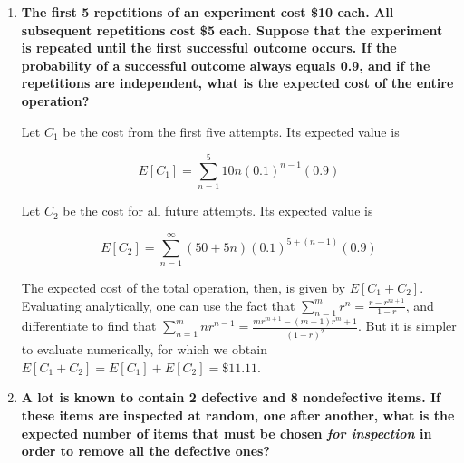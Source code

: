 \documentclass[10pt, oneside]{article}
\begin{document}
\begin{enumerate}[label=7.\arabic*]
\begin{tcolorbox}[
  colback=Cerulean!5!white,
  colframe=Cerulean!75!black]
\[ \bm{f(x) = e^{-x}, \qquad x > 0} \]

\textbf{Suppose that the cost of manufacturing one such item is \$2.00. The manufacturer sells the item for \$5.00, but guarantees a total refund if $\bm{X \leq 0.9}$. What is the manufacturer's expected profit per item?}
\end{tcolorbox}

Using the distribution, we have

\[ P(X \leq 0.9) = \int^{0.9}_0 e^{-x} \ dx = 1 - e^{-0.9} \]

Therefore, the probability that the item warrants a refund is $1 - e^{-0.9}$, and that it does not is $e^{-0.9}$. The expectation of the profit is thus

\[ E[\text{Profit}] = (5-2) e^{-0.9} + (-2) (1 - e^{-0.9}) = \boxed{\$ 0.03} \]

\item  \begin{tcolorbox}[
  colback=Cerulean!5!white,
  colframe=Cerulean!75!black]
\textbf{The first 5 repetitions of an experiment cost \$10 each. All subsequent repetitions cost \$5 each. Suppose that the experiment is repeated until the first successful outcome occurs. If the probability of a successful outcome always equals 0.9, and if the repetitions are independent, what is the expected cost of the entire operation?}
\end{tcolorbox}

Let $C_1$ be the cost from the first five attempts. Its expected value is

\[ E[C_1] = \sum^5_{n=1} 10n (0.1)^{n-1} (0.9) \]

Let $C_2$ be the cost for all future attempts. Its expected value is

\[ E[C_2] = \sum_{n=1}^\infty (50 + 5n) (0.1)^{5 + (n-1)} (0.9) \]

The expected cost of the total operation, then, is given by $E[C_1 + C_2]$. Evaluating analytically, one can use the fact that $\sum^m_{n=1} r^n = \frac{r - r^{m+1}}{1-r}$, and differentiate to find that $\sum^m_{n=1} nr^{n-1} = \frac{mr^{m+1} - (m+1) r^m + 1}{(1-r)^2}$. But it is simpler to evaluate numerically, for which we obtain $E[C_1 + C_2] = E[C_1] + E[C_2] = \boxed{\$ 11.11}$.

\item  \begin{tcolorbox}[
  colback=Cerulean!5!white,
  colframe=Cerulean!75!black]
\textbf{A lot is known to contain 2 defective and 8 nondefective items. If these items are inspected at random, one after another, what is the expected number of items that must be chosen \textit{for inspection} in order to remove all the defective ones?}
\end{tcolorbox}


\end{enumerate}
\end{document}
